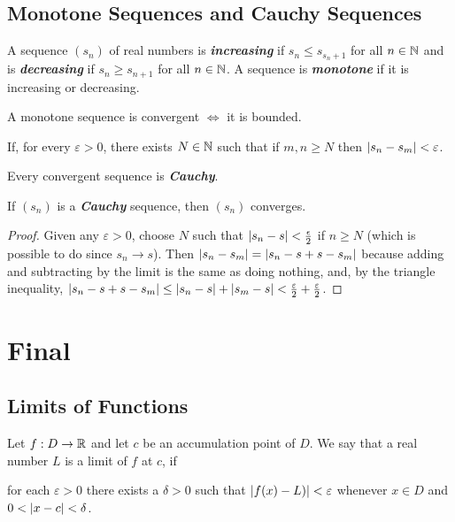 \documentclass[12pt]{article}
\begin{document}
\subsection{Monotone Sequences and Cauchy Sequences}
\label{sec:org6f63b9d}
\begin{definition}
  A sequence $(s_n)$ of real numbers is \textit{\textbf{increasing}} if $s_n \le
  s_{s_n+1}$ for all $n \in \mathbb{N}$ and is \textit{\textbf{decreasing}} if
  $s_n \ge s_{n+1}$ for all $n \in \mathbb{N}$. A sequence is
  \textbf{\textit{monotone}} if it is increasing or decreasing.
\end{definition}

\begin{definition}
  A monotone sequence is convergent $\iff$ it is bounded.
\end{definition}

\begin{definition}
If, for every $\varepsilon>0$, there exists $N \in \mathbb{N}$ such that if $m,n \ge N$ then
$\left|s_n - s_m\right| < \varepsilon$.

Every convergent sequence is \textit{\textbf{Cauchy}}.

If $(s_n)$ is a \textit{\textbf{Cauchy}} sequence, then $(s_n)$ converges.
\end{definition}

\begin{proof}
   Given any $\varepsilon > 0$, choose $N$ such that $\left|s_n - s\right| < \frac{\epsilon}{2}$ if
  $n \ge N$ (which is possible to do since $s_n \rightarrow s$). Then $\left|s_n - s_m\right| =
  \left|s_n - s + s - s_m\right|$ because adding and subtracting by the limit is the
  same as doing nothing, and, by the triangle inequality, $\left|s_n - s + s -
  s_m\right| \le \left|s_n - s\right| + \left|s_m - s\right| < \frac{\varepsilon}{2} + \frac{\varepsilon}{2}$.
\end{proof}

\section{Final}
\label{sec:org0c692d8}
\subsection{Limits of Functions}
\label{sec:orgaa0a514}
\begin{definition}[Limit of $f$ at $c$]
  Let $f : D \rightarrow \mathbb{R}$ and let $c$  be an accumulation point of $D$. We
  say that a real number $L$ is a limit of $f$ at $c$, if
  \begin{center}
    for each $\varepsilon > 0$ there exists a $\delta > 0$ such that $\left|f(x)
      - L)\right| < \varepsilon$ whenever $x \in D$ and $0 < \left|x - c\right| < \delta$.
  \end{center}
\end{definition}
\end{document}
